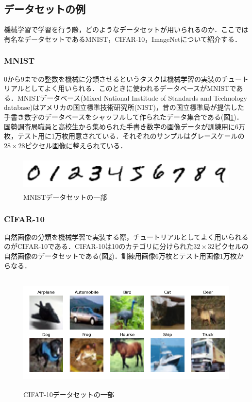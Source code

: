 \documentclass[a4paper,11pt]{jsreport}
\begin{document}
\subsection{データセットの例}
機械学習で学習を行う際，どのようなデータセットが用いられるのか．ここでは有名なデータセットであるMNIST，CIFAR-10，ImageNetについて紹介する．
\subsubsection*{MNIST}
0から9までの整数を機械に分類させるというタスクは機械学習の実装のチュートリアルとしてよく用いられる．このときに使われるデータベースがMNISTである．MNISTデータベース(Mixed National Institude of Standards and Technology database)はアメリカの国立標準技術研究所(NIST)，昔の国立標準局が提供した手書き数字のデータベースをシャッフルして作られたデータ集合である(図\ref{MNIST})．国勢調査局職員と高校生から集められた手書き数字の画像データが訓練用に6万枚，テスト用に1万枚用意されている．それぞれのサンプルはグレースケールの$28 \times 28$ピクセル画像に整えられている．
\begin{figure}[H]
  \begin{center}
      \includegraphics[height=1.8cm]{image/mnist.png}
      \caption{MNISTデータセットの一部}
      \label{MNIST}
  \end{center}
\end{figure}
\subsubsection{CIFAR-10}
自然画像の分類を機械学習で実装する際，チュートリアルとしてよく用いられるのがCIFAR-10である．CIFAR-10は10のカテゴリに分けられた$32 \times 32$ピクセルの自然画像のデータセットである(図\ref{CIFAR10})．訓練用画像6万枚とテスト用画像1万枚からなる．
\begin{figure}[H]
  \begin{center}
      \includegraphics[height=6cm]{image/CIFAR10.png}
      \caption{CIFAT-10データセットの一部}
      \label{CIFAR10}
  \end{center}
\end{figure}
\end{document}
